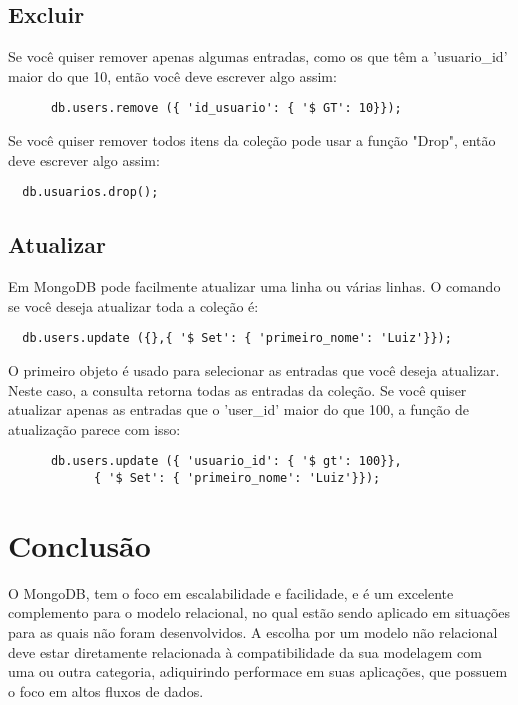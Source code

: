 \documentclass[12pt]{article}
\begin{document}
	 
\subsection{Excluir}  
Se você quiser remover apenas algumas entradas, como os que
têm a 'usuario\_id' maior do que 10, então você deve escrever algo assim: 
\begin{verbatim}
	  db.users.remove ({ 'id_usuario': { '$ GT': 10}}); 
\end{verbatim}
Se você quiser remover todos itens da coleção pode usar a função "Drop", então deve escrever algo assim:
\begin{verbatim}
  db.usuarios.drop();
\end{verbatim}


\subsection{Atualizar}  
Em MongoDB pode facilmente atualizar uma linha ou várias
linhas. O comando se você deseja atualizar toda a coleção é:
\begin{verbatim}
  db.users.update ({},{ '$ Set': { 'primeiro_nome': 'Luiz'}}); 
\end{verbatim}
O primeiro objeto é usado para selecionar as entradas que você deseja atualizar. Neste
caso, a consulta retorna todas as entradas da coleção. Se você quiser atualizar apenas as entradas que o 'user\_id' maior do que 100, a função de atualização parece com isso:
\begin{verbatim}
	  db.users.update ({ 'usuario_id': { '$ gt': 100}},
	    	{ '$ Set': { 'primeiro_nome': 'Luiz'}}); 
\end{verbatim}



\section{Conclusão}
	O MongoDB, tem o foco em escalabilidade e facilidade, e é um excelente complemento para o modelo relacional, no qual estão sendo aplicado em situações para as quais não foram desenvolvidos. A escolha por um modelo não relacional deve estar diretamente relacionada à compatibilidade da sua modelagem com uma ou outra categoria, adiquirindo performace em suas aplicações, que possuem o foco em altos fluxos de dados.
	
	
 


\end{document}
